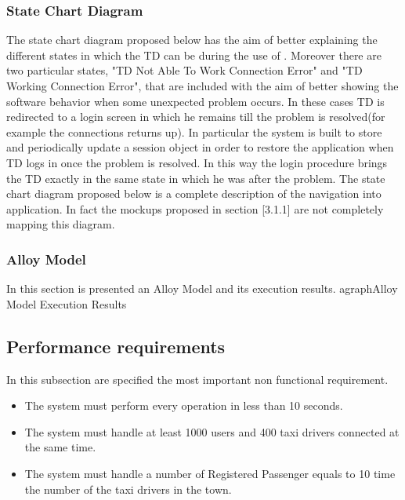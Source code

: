 \subsubsection{State Chart Diagram}
\begin{itemize}
 The state chart diagram proposed below has the aim of better explaining the different states in which the TD can be during the use of \myTaxiService{}. 
Moreover there are two particular states, "TD Not Able To Work Connection Error" and "TD Working Connection Error", that are included with the aim of better showing the software behavior when some unexpected problem occurs. 
In these cases TD is redirected to a login screen in which he remains till the problem is resolved(for example the connections returns up). 
In particular the system is built to store and periodically update a session object in order to restore the application when TD logs in once the problem is resolved.  
In this way the login procedure  brings the TD exactly in the same state in which he was after the problem.
 The state chart diagram proposed below is a complete description of the navigation into \myTaxiService{} application.  In fact the mockups proposed in section [3.1.1] are not completely mapping this diagram.
\end{itemize}
\newpage
\subsubsection{Alloy Model}
In this section is presented an Alloy Model and its execution results.
agraph{Alloy Model Execution Results}
\begin{itemize}
	\newpage
	\newpage
	\newpage
	\newpage
\end{itemize}
\subsection{Performance requirements}
In this subsection are specified the most important non functional requirement.
\begin{itemize}
	\item The system must perform every operation in less than 10 seconds.
	\item The system must handle at least 1000 users and 400 taxi drivers connected at the same time.
	\item The system must handle a number of Registered Passenger equals to 10 time the number of the taxi drivers in the town.
\end{itemize}
